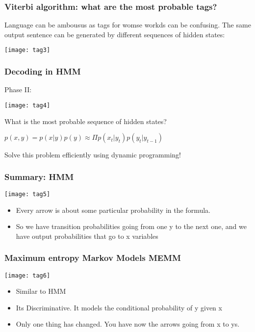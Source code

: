\begin{frame}[fragile]
  \frametitle{Viterbi algorithm: what are the most probable tags?}
Language can be ambousus as tags for womse workds can be confusing. The same output sentence can be generated by different
sequences of hidden states:
\begin{center}
\texttt{[image: tag3]}
\end{center}
 \end{frame} 
  
  
\begin{frame}[fragile]
  \frametitle{Decoding in HMM}
Phase II:
\begin{center}
\texttt{[image: tag4]}
\end{center}

What is the most probable sequence of hidden states? 

$p(x,y) = p(x|y)p(y) \approx \Pi p(x_t|y_t)p(y_t|y_{t-1})$

Solve this problem efficiently using dynamic programming!
 \end{frame} 
  
  
\begin{frame}[fragile]
  \frametitle{Summary: HMM}

\begin{center}
\texttt{[image: tag5]}
\end{center}

  \begin{itemize}
\item Every arrow is about some particular probability in the formula. 
\item So we have transition probabilities going from one y to the next one, and we have output probabilities that go to x variables
  	  \end{itemize}
 \end{frame} 
 
   
\begin{frame}[fragile]
  \frametitle{Maximum entropy Markov Models MEMM}

\begin{center}
\texttt{[image: tag6]}
\end{center}

  \begin{itemize}
\item Similar to HMM
\item Its  Discriminative. It models the conditional probability of y given x
\item  Only one thing has changed. You have now the arrows going from x to ys.
  	  \end{itemize}
 \end{frame} 
 
